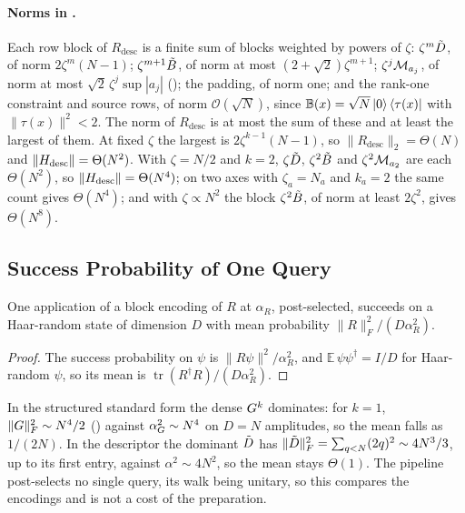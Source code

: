 \paragraph{Norms in .} Each row block of $R_{\mathrm{desc}}$ is a finite sum of blocks weighted by powers of $\zeta$: $\zeta^m\tilde{D}$, of norm $2\zeta^m(N-1)$; $\zeta^{m+1}\tilde{B}$, of norm at most $(2+\sqrt2)\zeta^{m+1}$; $\zeta^j\mathcal{M}_{a_j}$, of norm at most $\sqrt2\,\zeta^j\sup|a_j|$ (); the padding, of norm one; and the rank-one constraint and source rows, of norm $\mathcal{O}(\sqrt N)$, since $\mathbb{B}(x)=\sqrt N\ket0\bra{\tau(x)}$ with $\|\tau(x)\|^2<2$. The norm of $R_{\mathrm{desc}}$ is at most the sum of these and at least the largest of them. At fixed $\zeta$ the largest is $2\zeta^{k-1}(N-1)$, so $\|R_{\mathrm{desc}}\|_2=\Theta(N)$ and $\|H_{\mathrm{desc}}\|=\Theta(N^2)$. With $\zeta=N/2$ and $k=2$, $\zeta\tilde{D}$, $\zeta^2\tilde{B}$ and $\zeta^2\mathcal{M}_{a_2}$ are each $\Theta(N^2)$, so $\|H_{\mathrm{desc}}\|=\Theta(N^4)$; on two axes with $\zeta_a=N_a$ and $k_a=2$ the same count gives $\Theta(N^4)$; and with $\zeta\propto N^2$ the block $\zeta^2\tilde{B}$, of norm at least $2\zeta^2$, gives $\Theta(N^8)$.

\subsection{Success Probability of One Query}
\label{app:haar-success}

\begin{proposition}
\label{prop:haar-success}
One application of a block encoding of $R$ at $\alpha_R$, post-selected, succeeds on a Haar-random state of dimension $D$ with mean probability $\|R\|_F^2/(D\alpha_R^2)$.
\end{proposition}
\begin{proof}
The success probability on $\psi$ is $\|R\psi\|^2/\alpha_R^2$, and $\mathbb{E}\,\psi\psi^\dagger=I/D$ for Haar-random $\psi$, so its mean is $\operatorname{tr}(R^\dagger R)/(D\alpha_R^2)$.
\end{proof}

In the structured standard form the dense $G^k$ dominates: for $k=1$, $\|G\|_F^2\sim N^4/2$ () against $\alpha_G^2\sim N^4$ on $D=N$ amplitudes, so the mean falls as $1/(2N)$. In the descriptor the dominant $\tilde{D}$ has $\|\tilde{D}\|_F^2=\sum_{q<N}(2q)^2\sim4N^3/3$, up to its first entry, against $\alpha^2\sim4N^2$, so the mean stays $\Theta(1)$. The pipeline post-selects no single query, its walk being unitary, so this compares the encodings and is not a cost of the preparation.
